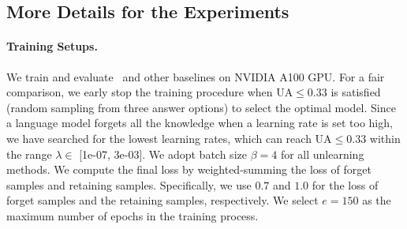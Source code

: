 \subsection{More Details for the Experiments}
\label{apx:exp_setups}
\paragraph{Training Setups.}
We train and evaluate \ourmodel~and other baselines on NVIDIA A100 GPU. 
For a fair comparison, we early stop the training procedure when UA$\leq 0.33$ is satisfied (random sampling from three answer options) to select the optimal model.
Since a language model forgets all the knowledge when a learning rate is set too high, we have searched for the lowest learning rates, which can reach UA$\leq 0.33$ within the range $\lambda \in$ [1e-07, 3e-03].
We adopt batch size $\beta = 4$ for all unlearning methods.
We compute the final loss by weighted-summing the loss of forget samples and retaining samples.
Specifically, we use $0.7$ and $1.0$ for the loss of forget samples and the retaining samples, respectively.
We select $e = 150$ as the maximum number of epochs in the training process.


